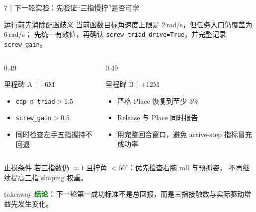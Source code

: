 \documentclass[aspectratio=169,10pt]{ctexbeamer}
\newcommand{\takeaway}[1]{%
  \begin{beamercolorbox}[wd=\textwidth,rounded=true,sep=0.55ex]{takeaway}
    \footnotesize\textcolor{Green}{\bfseries 结论：}\,#1
  \end{beamercolorbox}}
\begin{document}
\begin{frame}[t]{7｜下一轮实验：先验证“三指慢拧”是否可学}
  \begin{block}{运行前先消除配置歧义}
    当前函数目标角速度上限是 $2$\,rad/s，但任务入口仍覆盖为 $6$\,rad/s；
    先统一有效值，再确认 \texttt{screw\_triad\_drive=True}，并完整记录 \texttt{screw\_gain}。
  \end{block}

  \begin{columns}[T,onlytextwidth]
    \begin{column}{0.49\textwidth}
      \begin{block}{里程碑 A｜$+6$M}
        \begin{itemize}
          \item \texttt{cap\_n\_triad}$>1.5$
          \item \texttt{screw\_gain}$>0.5$
          \item 同时检查左手五指握持不回退
        \end{itemize}
      \end{block}
    \end{column}
    \begin{column}{0.49\textwidth}
      \begin{block}{里程碑 B｜$+12$M}
        \begin{itemize}
          \item 严格 Place 恢复到至少 $3\%$
          \item Release 与 Place 同时报告
          \item 用完整回合窗口，避免 active-step 指标冒充成功率
        \end{itemize}
      \end{block}
    \end{column}
  \end{columns}

  \begin{alertblock}{止损条件}
    若三指数仍 $\approx1$ 且拧角 $<50^\circ$：优先检查右腕 roll 与预抓姿，
    不再继续提高三指 shaping 权重。
  \end{alertblock}

  \takeaway{下一轮第一成功标准不是总回报，而是三指接触数与实际驱动增益先发生变化。}
\end{frame}
\end{document}
